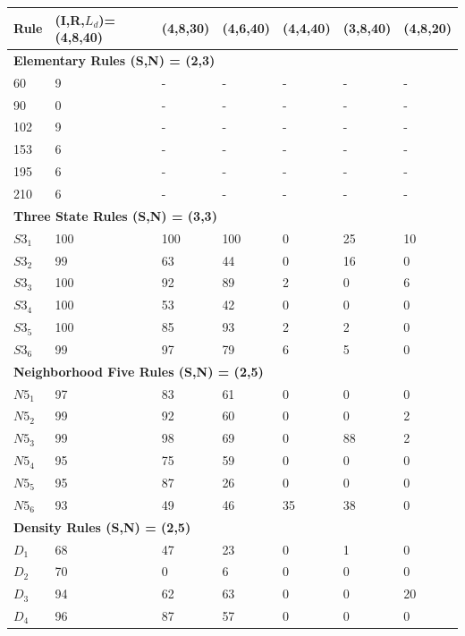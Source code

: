 \documentclass{elsarticle}
\begin{document}
\begin{multicols}{2}
\begin{table}[!htbp] \centering
\small
\begin{tabular}{|l|l|l|l|l|l|l|}
\hline
\textbf{Rule} & \textbf{(I,R,$L_{d}$)=(4,8,40)} & \textbf{(4,8,30)} & 
\textbf{(4,6,40)} & \textbf{(4,4,40)} & \textbf{(3,8,40)} & \textbf{(4,8,20)} 
\\ \hline
\multicolumn{7}{|l|}{\textbf{Elementary Rules (S,N) = (2,3)}} \\ \hline
60 & 9 & - & - & - & - & - \\ \hline
90 & 0 & - & - & - & - & - \\ \hline
102 & 9 & - & - & - & - & - \\ \hline
153 & 6 & - & - & - & - & - \\ \hline
195 & 6 & - & - & - & - & - \\ \hline
210 & 6 & - & - & - & - & - \\ \hline
\multicolumn{7}{|l|}{\textbf{Three State Rules (S,N) = (3,3)}} \\ \hline
$S3_{1}$ & 100 & 100 & 100 & 0 & 25 & 10 \\ \hline
$S3_{2}$ & 99 & 63 & 44 & 0 & 16 & 0 \\ \hline
$S3_{3}$ & 100 & 92 & 89 & 2 & 0 & 6 \\ \hline
$S3_{4}$ & 100 & 53 & 42 & 0 & 0 & 0 \\ \hline
$S3_{5}$ & 100 & 85 & 93 & 2 & 2 & 0 \\ \hline
$S3_{6}$ & 99 & 97 & 79 & 6 & 5 & 0 \\ \hline
\multicolumn{7}{|l|}{\textbf{Neighborhood Five Rules (S,N) = (2,5)}} \\ \hline
$N5_{1}$ & 97 & 83 & 61 & 0 & 0 & 0 \\ \hline
$N5_{2}$ & 99 & 92 & 60 & 0 & 0 & 2 \\ \hline
$N5_{3}$ & 99 & 98 & 69 & 0 & 88 & 2  \\ \hline
$N5_{4}$ & 95 & 75 & 59 & 0 & 0 & 0 \\ \hline
$N5_{5}$ & 95 & 87 & 26 & 0 & 0 & 0 \\ \hline
$N5_{6}$ & 93 & 49 & 46 & 35 & 38 & 0  \\ \hline
\multicolumn{7}{|l|}{\textbf{Density Rules (S,N) = (2,5)}} \\ \hline
$D_{1}$ & 68 & 47 & 23 & 0 & 1 & 0  \\ \hline
$D_{2}$ & 70 & 0 & 6 & 0 & 0 & 0 \\ \hline
$D_{3}$ & 94 & 62 & 63 & 0 & 0 & 20 \\ \hline
$D_{4}$ & 96 & 87 & 57 & 0 & 0 & 0 \\ \hline

\end{tabular}
\end{table}
\end{multicols}
\end{document}
